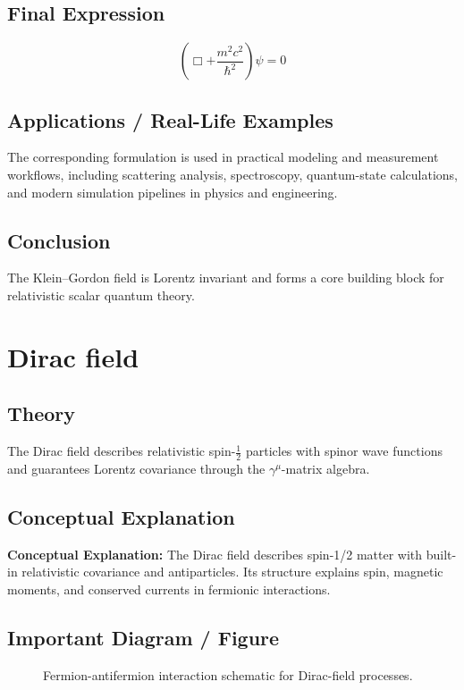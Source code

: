\documentclass[12pt]{report}
\begin{document}
\subsection*{Final Expression}
\begin{equation}
\boxed{\left(\Box+\frac{m^2c^2}{\hbar^2}\right)\psi=0}
\end{equation}

\subsection*{Applications / Real-Life Examples}
The corresponding formulation is used in practical modeling and measurement workflows, including scattering analysis, spectroscopy, quantum-state calculations, and modern simulation pipelines in physics and engineering.

\subsection*{Conclusion}
The Klein--Gordon field is Lorentz invariant and forms a core building block for relativistic scalar quantum theory.

\section{Dirac field}



\subsection*{Theory}
The Dirac field describes relativistic spin-$\frac12$ particles with spinor wave functions and guarantees Lorentz covariance through the $\gamma^\mu$-matrix algebra.


\subsection{Conceptual Explanation}
\textbf{Conceptual Explanation:} The Dirac field describes spin-1/2 matter with built-in relativistic covariance and antiparticles. Its structure explains spin, magnetic moments, and conserved currents in fermionic interactions.


\subsection*{Important Diagram / Figure}
\begin{figure}[H]
    \centering
    \caption{Fermion-antifermion interaction schematic for Dirac-field processes.}
\end{figure}
\end{document}
